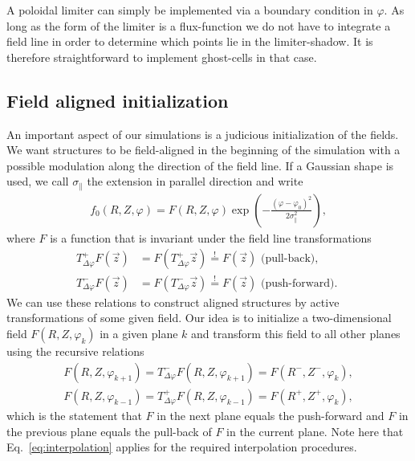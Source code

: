 A poloidal limiter can simply be implemented via a boundary condition in $\varphi$. 
As long as the form of the limiter is a flux-function we do not have to 
integrate a field line in order to determine which points lie in the
limiter-shadow. It is therefore straightforward to implement ghost-cells 
in that case. 

\subsection{Field aligned initialization} \label{sec:parallelc}

An important aspect of our simulations is a judicious initialization of the 
fields. We want structures to be field-aligned in the beginning of the simulation with
a possible modulation along the direction of the field line.
If a Gaussian shape is used, we call $\sigma_\parallel$ the extension in parallel
direction and write
\begin{align}
    f_0(R,Z,\varphi) = F(R,Z,\varphi) \exp\left( - \frac{(\varphi-\varphi_0)^2}{2\sigma_\parallel^2}\right),
    \label{eq:parallelInit}
\end{align}
where $F$ is a function that is invariant under the field line transformations
\begin{subequations}
\begin{align}
    T_{\Delta\varphi}^+ F(\vec z) &= F( T_{\Delta\varphi}^+\vec z) \overset{!}{=} F(\vec z) \text{ (pull-back), } \\
    T_{\Delta\varphi}^- F(\vec z) &= F( T_{\Delta\varphi}^-\vec z) \overset{!}{=} F(\vec z) \text{ (push-forward). } 
\end{align}
\label{}
\end{subequations}
We can use these relations to construct aligned structures
by active transformations of some given field.
Our idea is to initialize a two-dimensional field $F(R,Z, \varphi_k)$ in a given plane $k$ and 
transform this field to all other planes using the recursive relations
\begin{subequations}
\begin{align}
    F( R, Z, \varphi_{k+1}) = T_{\Delta\varphi}^- F( R, Z, \varphi_{k+1}) = F(R^-, Z^-, \varphi_k), \\
    F( R, Z, \varphi_{k-1}) = T_{\Delta\varphi}^+ F( R, Z, \varphi_{k-1}) = F(R^+, Z^+, \varphi_k),
\end{align}
    \label{eq:recursiveInit}
\end{subequations}
which is the statement that $F$ in the next plane equals the push-forward  
and $F$ in the previous plane equals the pull-back of $F$ in the current plane. 
Note here that Eq.~\eqref{eq:interpolation} applies for the required interpolation
procedures. 

